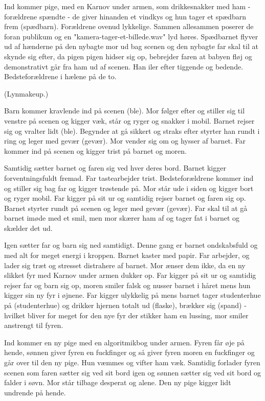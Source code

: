 \documentclass[a4paper,11pt]{article}
\begin{document}
\begin{sketch}
{Ind kommer pige, med en Karnov under armen, som drikkesnakker med ham - forældrene spændte - de giver hinanden et vindkys og hun tager et spædbarn frem (spædbarn). Forældrene ovenud lykkelige. Sammen allesammen poserer de foran publikum og en "kamera-tager-et-billede.wav" lyd høres. Spædbarnet flyver ud af hænderne på den nybagte mor ud bag scenen og den nybagte far skal til at skynde sig efter, da pigen pigen hidser sig op, bebrejder faren at babyen fløj og demonstrativt går fra ham ud af scenen. Han iler efter tiggende og bedende. Bedsteforældrene i hælene på de to.


(Lynmakeup.)


Barn kommer kravlende ind på scenen (ble). Mor følger efter og stiller sig til venstre på scenen og kigger væk, står og ryger og snakker i mobil. Barnet rejser sig og vralter lidt (ble). Begynder at gå sikkert og straks efter styrter han rundt i ring og leger med gevær (gevær). Mor vender sig om og hysser af barnet. Far kommer ind på scenen og kigger trist på barnet og moren.

Samtidig sætter barnet og faren sig ved hver deres bord. Barnet kigger forventningsfuldt fremad. Far tastearbejder trist. Bedsteforældrene kommer ind og stiller sig bag far og kigger trøstende på. Mor står ude i siden og kigger bort og ryger mobil. Far kigger på sit ur og samtidig rejser barnet og faren sig op. Barnet styrter rundt på scenen og leger med gevær (gevær). Far skal til at gå barnet imøde med et smil, men mor skærer ham af og tager fat i barnet og skælder det ud.

Igen sætter far og barn sig ned samtidigt. Denne gang er barnet ondskabsfuld og med alt for meget energi i kroppen. Barnet kaster med papir. Far arbejder, og lader sig træt og stresset distrahere af barnet. Mor ænser dem ikke, da en ny slikket fyr med Karnov under armen dukker op. Far kigger på sit ur og samtidig rejser far og barn sig op, moren smiler falsk og nusser barnet i håret mens hun kigger sin ny fyr i øjnene. Far kigger ulykkelig på mens barnet tager studenterhue på (studenterhue) og drikker hjernen totalt ud (flaske), brækker sig (spand) - hvilket bliver for meget for den nye fyr der stikker ham en lussing, mor smiler anstrengt til fyren.

Ind kommer en ny pige med en algoritmikbog under armen. Fyren får øje på hende, sønnen giver fyren en fuckfinger og så giver fyren moren en fuckfinger og går over til den ny pige. Hun væmmes og vifter ham væk. Samtidig forlader fyren scenen som faren sætter sig ved sit bord igen og sønnen sætter sig ved sit bord og falder i søvn. Mor står tilbage desperat og alene. Den ny pige kigger lidt undrende på hende.

}
\end{sketch}
\end{document}
